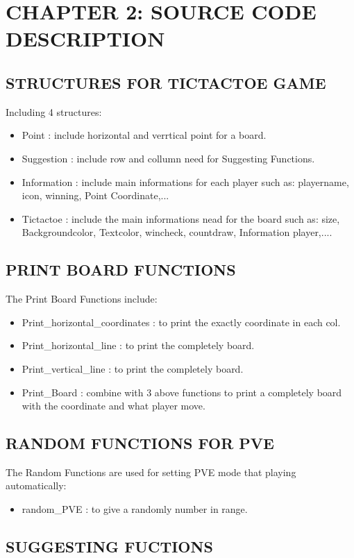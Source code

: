 \documentclass[12pt,a4paper]{article}
\begin{document}
\section{\textbf{\color{red}CHAPTER 2: SOURCE CODE DESCRIPTION}}
\Large \subsection{\color{blue}\textbf{STRUCTURES FOR TICTACTOE GAME} }
Including 4 structures:
\begin{itemize}
    \item Point : include horizontal and verrtical point for a board.
    \item Suggestion : include row and collumn need for Suggesting Functions.
    \item Information : include main informations for each player such as: playername, icon, winning, Point Coordinate,...
    \item Tictactoe : include the main informations nead for the board such as: size, Backgroundcolor, Textcolor, wincheck, countdraw, Information player,....
\end{itemize}
\Large \subsection{\color{blue}\textbf{PRINT BOARD FUNCTIONS} }
The Print Board Functions include:
\begin{itemize}
    \item Print\_horizontal\_coordinates : to print the exactly coordinate in each col.
    \item Print\_horizontal\_line : to print the completely board.
    \item Print\_vertical\_line : to print the completely board.
    \item Print\_Board : combine with 3 above functions to print a completely board with the coordinate and what player move.
\end{itemize}
\Large \subsection{\color{blue}\textbf{RANDOM FUNCTIONS FOR PVE} }
The Random Functions are used for setting PVE mode that playing automatically:
\begin{itemize}
    \item random\_PVE : to give a randomly number in range.
\end{itemize}
\Large \subsection{\color{blue}\textbf{SUGGESTING FUCTIONS} }
\end{document}

